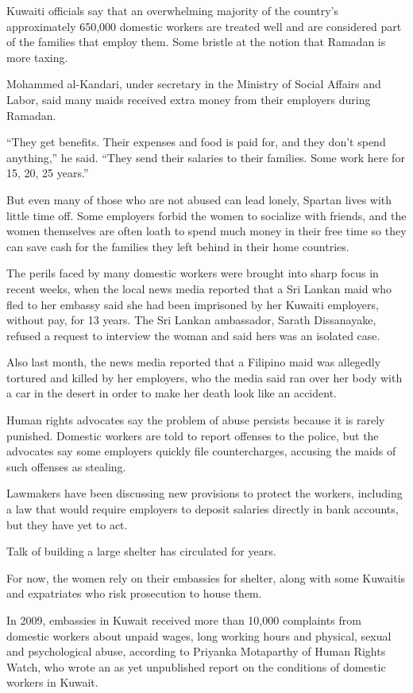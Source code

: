 ﻿\documentclass[12pt]{article}
\begin{document}
Kuwaiti officials say that an overwhelming majority of the country's approximately 650,000 domestic
workers are treated well and are considered part of the families that employ them. Some bristle at
the notion that Ramadan is more taxing.

Mohammed al-Kandari, under secretary in the Ministry of Social Affairs and Labor, said many maids
received extra money from their employers during Ramadan.

``They get benefits. Their expenses and food is paid for, and they don't spend anything,'' he said.
``They send their salaries to their families. Some work here for 15, 20, 25 years.''

But even many of those who are not abused can lead lonely, Spartan lives with little time off. Some
employers forbid the women to socialize with friends, and the women themselves are often loath to
spend much money in their free time so they can save cash for the families they left behind in their
home countries.

The perils faced by many domestic workers were brought into sharp focus in recent weeks, when the
local news media reported that a Sri Lankan maid who fled to her embassy said she had been
imprisoned by her Kuwaiti employers, without pay, for 13 years. The Sri Lankan ambassador, Sarath
Dissanayake, refused a request to interview the woman and said hers was an isolated case.

Also last month, the news media reported that a Filipino maid was allegedly tortured and killed by
her employers, who the media said ran over her body with a car in the desert in order to make her
death look like an accident.

Human rights advocates say the problem of abuse persists because it is rarely punished. Domestic
workers are told to report offenses to the police, but the advocates say some employers quickly file
countercharges, accusing the maids of such offenses as stealing.

Lawmakers have been discussing new provisions to protect the workers, including a law that would
require employers to deposit salaries directly in bank accounts, but they have yet to act.

Talk of building a large shelter has circulated for years.

For now, the women rely on their embassies for shelter, along with some Kuwaitis and expatriates who
risk prosecution to house them.

In 2009, embassies in Kuwait received more than 10,000 complaints from domestic workers about unpaid
wages, long working hours and physical, sexual and psychological abuse, according to Priyanka
Motaparthy of Human Rights Watch, who wrote an as yet unpublished report on the conditions of
domestic workers in Kuwait.
\end{document}
